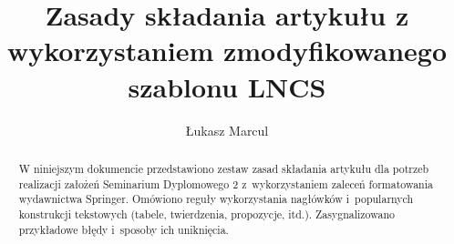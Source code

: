 

\title{Zasady składania artykułu z wykorzystaniem zmodyfikowanego szablonu LNCS}
\author{Łukasz Marcul}



\maketitle

\begin{abstract}
	W niniejszym dokumencie przedstawiono zestaw zasad składania artykułu dla potrzeb realizacji założeń Seminarium Dyplomowego 2 z~wykorzystaniem zaleceń formatowania wydawnictwa Springer. Omówiono reguły wykorzystania nagłówków i~popularnych konstrukcji tekstowych (tabele, twierdzenia, propozycje, itd.). Zasygnalizowano przykładowe błędy i~sposoby ich uniknięcia.

\end{abstract}








